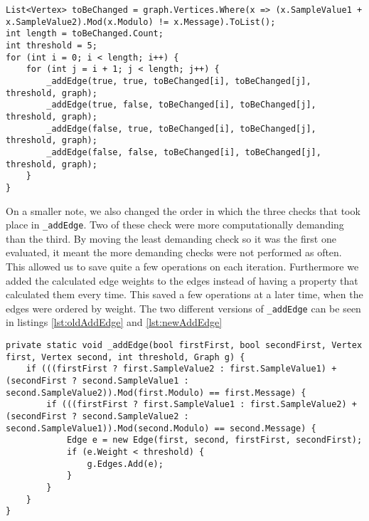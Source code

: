 \begin{lstlisting}[firstnumber=449,label=lst:newEdgeAdding, caption={Improved algorithm for adding edges to the graph.}]
List<Vertex> toBeChanged = graph.Vertices.Where(x => (x.SampleValue1 + x.SampleValue2).Mod(x.Modulo) != x.Message).ToList();
int length = toBeChanged.Count;
int threshold = 5;
for (int i = 0; i < length; i++) {
    for (int j = i + 1; j < length; j++) {
        _addEdge(true, true, toBeChanged[i], toBeChanged[j], threshold, graph);
        _addEdge(true, false, toBeChanged[i], toBeChanged[j], threshold, graph);
        _addEdge(false, true, toBeChanged[i], toBeChanged[j], threshold, graph);
        _addEdge(false, false, toBeChanged[i], toBeChanged[j], threshold, graph);
    }
}
\end{lstlisting}

On a smaller note, we also changed the order in which the three checks that took place in \lstinline|_addEdge|.
Two of these check were more computationally demanding than the third.
By moving the least demanding check so it was the first one evaluated, it meant the more demanding checks were not performed as often.
This allowed us to save quite a few operations on each iteration.
Furthermore we added the calculated edge weights to the edges instead of having a property that calculated them every time.
This saved a few operations at a later time, when the edges were ordered by weight.
The two different versions of \lstinline|_addEdge| can be seen in listings \ref{lst:oldAddEdge} and \ref{lst:newAddEdge}

\begin{lstlisting}[firstnumber=478,label=lst:oldAddEdge, caption={The original \lstinline|_addEdge| method.}]
private static void _addEdge(bool firstFirst, bool secondFirst, Vertex first, Vertex second, int threshold, Graph g) {
    if (((firstFirst ? first.SampleValue2 : first.SampleValue1) + (secondFirst ? second.SampleValue1 : second.SampleValue2)).Mod(first.Modulo) == first.Message) {
        if (((firstFirst ? first.SampleValue1 : first.SampleValue2) + (secondFirst ? second.SampleValue2 : second.SampleValue1)).Mod(second.Modulo) == second.Message) {
            Edge e = new Edge(first, second, firstFirst, secondFirst);
            if (e.Weight < threshold) {
                g.Edges.Add(e);
            }
        }
    }
}
\end{lstlisting}

